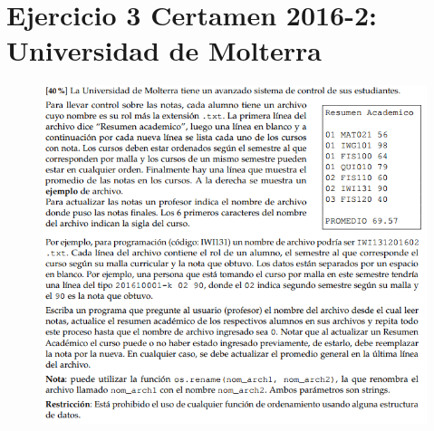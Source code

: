 \section{Ejercicio 3 Certamen 2016-2: Universidad de Molterra}

\begin{figure}[H]
\centering
\includegraphics[scale=1]{Imagenes/ej3.png}
\end{figure}